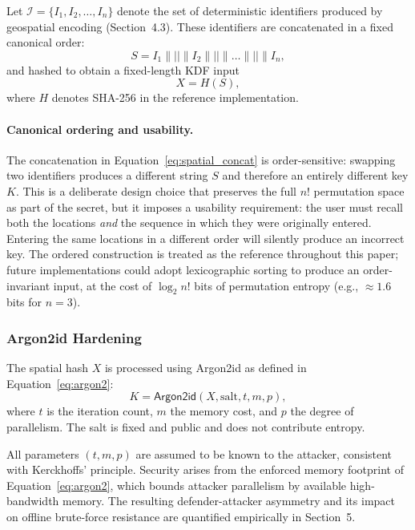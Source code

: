 \documentclass[journal,article,accept,pdftex,moreauthors]{Definitions/mdpi}
\begin{document}
Let $\mathcal{I} = \{I_1, I_2, \dots, I_n\}$ denote the set of deterministic identifiers produced by geospatial encoding (Section~4.3). These identifiers are concatenated in a fixed canonical order:
\begin{equation}
S = I_1 \parallel \texttt{||} \parallel I_2 \parallel \texttt{||} \parallel \dots \parallel \texttt{||} \parallel I_n ,
\label{eq:spatial_concat}
\end{equation}
and hashed to obtain a fixed-length KDF input
\begin{equation}
X = H(S),
\label{eq:spatial_hash}
\end{equation}
where $H$ denotes SHA-256 in the reference implementation.

\paragraph{Canonical ordering and usability.} The concatenation in Equation~\ref{eq:spatial_concat} is order-sensitive: swapping two identifiers produces a different string $S$ and therefore an entirely different key $K$. This is a deliberate design choice that preserves the full $n!$ permutation space as part of the secret, but it imposes a usability requirement: the user must recall both the locations \emph{and} the sequence in which they were originally entered. Entering the same locations in a different order will silently produce an incorrect key. The ordered construction is treated as the reference throughout this paper; future implementations could adopt lexicographic sorting to produce an order-invariant input, at the cost of $\log_2 n!$ bits of permutation entropy (e.g., $\approx 1.6$ bits for $n=3$).

\subsubsection{Argon2id Hardening}

The spatial hash $X$ is processed using Argon2id as defined in Equation~\ref{eq:argon2}:
\begin{equation}
K = \mathsf{Argon2id}(X, \text{salt}, t, m, p),
\label{eq:argon2}
\end{equation}
where $t$ is the iteration count, $m$ the memory cost, and $p$ the degree of parallelism. The salt is fixed and public and does not contribute entropy.

All parameters $(t,m,p)$ are assumed to be known to the attacker, consistent with Kerckhoffs’ principle. Security arises from the enforced memory footprint of Equation~\ref{eq:argon2}, which bounds attacker parallelism by available high-bandwidth memory. The resulting defender-attacker asymmetry and its impact on offline brute-force resistance are quantified empirically in Section~5.
\end{document}
